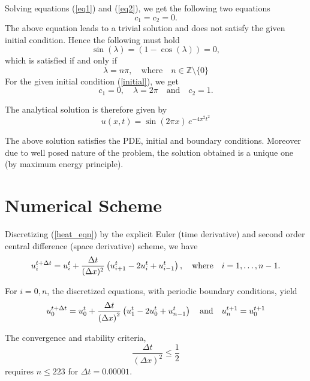 \documentclass[12pt]{article}
\begin{document}
	Solving equations (\ref{eq1}) and (\ref{eq2}), we get the following two equations
	\begin{equation*}
	c_1=c_2=0.
	\end{equation*}
	 The above equation leads to a trivial solution and does not satisfy the given initial condition. Hence the following must hold 
	 \begin{equation*}
	 \sin(\lambda)=(1-\cos(\lambda))=0,
	 \end{equation*}	
	which is satisfied if and only if	
	\begin{equation*}
	\lambda = n \pi, \quad \text{where}\quad  n \in \mathbb{Z}\setminus\{0\}
	\end{equation*}	
	For the given initial condition (\ref{initial}), we get	
	\begin{equation*}
	c_1 = 0,\quad \lambda = 2\pi\quad \text{and} \quad c_2 = 1.
	\end{equation*}
	
	The analytical solution is therefore given by	
	\begin{equation}
	u(x,t)= \sin(2 \pi x)\, e^{-4 \pi^2 t^2}
	\end{equation}
	
	The above solution satisfies the PDE, initial and boundary conditions. Moreover due to well posed nature of the problem, the solution obtained is a unique one (by maximum energy principle).
	
	\section{Numerical Scheme}
	Discretizing (\ref{heat_eqn}) by the explicit Euler (time derivative) and second order central difference (space derivative) scheme, we have
		\begin{equation*}
		u^{t+\Delta t}_{i}= u^t_i + {\Delta t \over (\Delta x)^2} \left(u^t_{i+1}-2u^t_i+u^t_{i-1}\right), \quad \text{where} \quad i=1,\ldots,n-1.
		\end{equation*} 
	
	For $i=0,n$, the discretized equations, with periodic boundary conditions, yield 
	\begin{equation*}
	u^{t+\Delta t}_{0}= u^t_0 + {\Delta t \over \left(\Delta x\right)^2} \left(u^t_{1}-2u^t_0+u^t_{n-1}\right) \quad \text{and}\quad 	u^{t+1}_{n}= u^{t+1}_0 
	\end{equation*} 

	The convergence and stability criteria, 
	\begin{equation*}
	\frac{\Delta t}{\left(\Delta x\right)^2} \leq \frac{1}{2}
	\end{equation*}
	requires $n \leq 223$ for $\Delta t=0.00001$.
\end{document}
